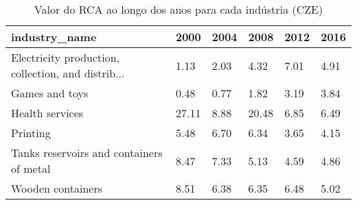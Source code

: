 \begin{table}
\centering
\caption{Valor do RCA ao longo dos anos para cada indústria (CZE)}
\begin{tabular}{p{6cm}p{1.5cm}p{1.5cm}p{1.5cm}p{1.5cm}p{1.5cm}}
\toprule
                                     industry\_name &  2000 & 2004 &  2008 & 2012 & 2016 \\
\midrule
Electricity production, collection, and distrib... &  1.13 & 2.03 &  4.32 & 7.01 & 4.91 \\
                                    Games and toys &  0.48 & 0.77 &  1.82 & 3.19 & 3.84 \\
                                   Health services & 27.11 & 8.88 & 20.48 & 6.85 & 6.49 \\
                                          Printing &  5.48 & 6.70 &  6.34 & 3.65 & 4.15 \\
          Tanks reservoirs and containers of metal &  8.47 & 7.33 &  5.13 & 4.59 & 4.86 \\
                                 Wooden containers &  8.51 & 6.38 &  6.35 & 6.48 & 5.02 \\
\bottomrule
\end{tabular}
\end{table}
